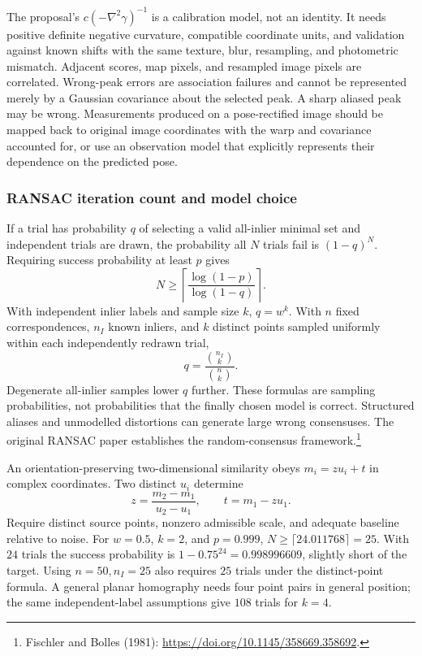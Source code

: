 \documentclass[11pt,a4paper]{article}
\numberwithin{equation}{section}
\begin{document}
The proposal's $c(-\nabla^2\gamma)^{-1}$ is a calibration model, not
an identity. It needs positive definite negative curvature, compatible
coordinate units, and validation against known shifts with the same
texture, blur, resampling, and photometric mismatch. Adjacent scores,
map pixels, and resampled image pixels are correlated. Wrong-peak errors
are association failures and cannot be represented merely by a Gaussian
covariance about the selected peak. A sharp aliased peak may be wrong.
Measurements produced on a pose-rectified image should be mapped back to
original image coordinates with the warp and covariance accounted for,
or use an observation model that explicitly represents their dependence
on the predicted pose.

\subsubsection{RANSAC iteration count and model choice}

If a trial has probability $q$ of selecting a valid all-inlier minimal
set and independent trials are drawn, the probability all $N$ trials
fail is $(1-q)^N$. Requiring success probability at least $p$ gives
\begin{equation}
 N\geq\left\lceil\frac{\log(1-p)}{\log(1-q)}\right\rceil.
 \label{eq:ransac-ceil}
\end{equation}
With independent inlier labels and sample size $k$, $q=w^k$.
With $n$ fixed correspondences, $n_I$ known inliers, and $k$ distinct
points sampled uniformly within each independently redrawn trial,
\begin{equation}
 q=\frac{\binom{n_I}{k}}{\binom n k}.
\end{equation}
Degenerate all-inlier samples lower $q$ further. These formulas are
sampling probabilities, not probabilities that the finally chosen model
is correct. Structured aliases and unmodelled distortions can generate
large wrong consensuses. The original RANSAC paper establishes the
random-consensus framework.\footnote{Fischler and Bolles (1981):
\url{https://doi.org/10.1145/358669.358692}.}

An orientation-preserving two-dimensional similarity obeys
$m_i=z u_i+t$ in complex coordinates. Two distinct $u_i$ determine
\begin{equation}
 z=\frac{m_2-m_1}{u_2-u_1},\qquad t=m_1-z u_1.
\end{equation}
Require distinct source points, nonzero admissible scale, and adequate
baseline relative to noise. For $w=0.5$, $k=2$, and $p=0.999$,
$N\geq\lceil24.011768\rceil=25$. With $24$ trials the success
probability is $1-0.75^{24}=0.998996609$, slightly short of the target.
Using $n=50,n_I=25$ also requires $25$ trials under the distinct-point
formula. A general planar homography needs four point pairs in general
position; the same independent-label assumptions give $108$ trials
for $k=4$.
\end{document}
